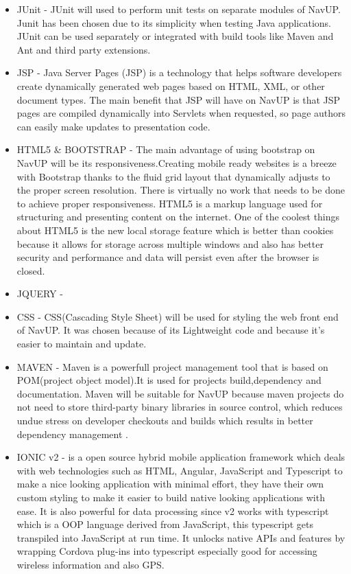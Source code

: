 \begin{itemize}
	\item JUnit - JUnit will used to perform unit tests on separate modules of NavUP. Junit has been chosen due to its simplicity when testing Java applications. JUnit can be used separately or integrated with build tools like Maven and Ant and third party extensions.
	
	\item JSP - Java Server Pages (JSP) is a technology that helps software developers create dynamically generated web pages based on HTML, XML, or other document types. The main benefit that JSP will have on NavUP is that JSP pages are compiled dynamically into Servlets when requested, so page authors can easily make updates to presentation code.
	
	\item HTML5 \& BOOTSTRAP - The main advantage of using bootstrap on NavUP will be its responsiveness.Creating mobile ready websites is a breeze with Bootstrap thanks to the fluid grid layout that dynamically adjusts to the proper screen resolution. There is virtually no work that needs to be done to achieve proper responsiveness. HTML5 is a markup language used for structuring and presenting content on the internet. One of the coolest things about HTML5 is the new local storage feature which is better than cookies because it allows for storage across multiple windows and also has better security and performance and data will persist even after the browser is closed.
	
	\item JQUERY - 
	
	\item CSS - CSS(Cascading Style Sheet) will be used for styling the web front end of NavUP. It was chosen because of its Lightweight code and because it's easier to maintain and update. 
	
	\item MAVEN - Maven is a powerfull project management tool that is based on POM(project object model).It is used for projects build,dependency and documentation. Maven will be suitable for NavUP because maven projects do not need to store third-party binary libraries in source control, which reduces undue stress on developer checkouts and builds which results in better dependency management
.	
	
	
	\item IONIC v2 - is a open source hybrid mobile application framework which deals with web technologies such as HTML, Angular, JavaScript and Typescript to make a nice looking application with minimal effort, they have their own custom styling to make it easier to build native looking applications with ease. It is also powerful for data processing since v2 works with typescript which is a OOP language derived from JavaScript, this typescript gets transpiled into JavaScript at run time. It unlocks native APIs and features by wrapping Cordova plug-ins into typescript especially good for accessing wireless information and also GPS.
	
	
	
\end{itemize}
